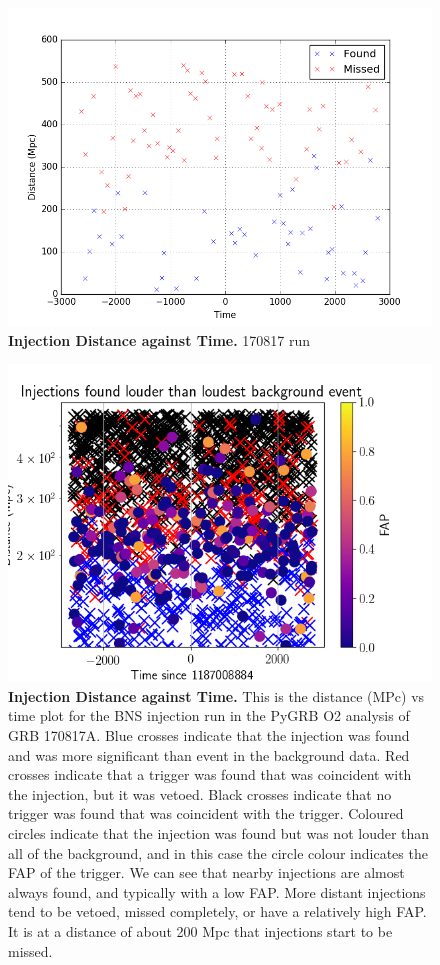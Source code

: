 \documentclass[11pt]{cuthesis}
\begin{document}
\begin{figure} %
\begin{center}
\includegraphics[width=0.8\linewidth]{injections_dist_time.png}
\end{center}
\caption{\textbf{Injection Distance against Time.} 170817 run} 
\label{fig:inj dist time}
\end{figure}

\begin{figure} %
\begin{center}
\includegraphics[width=0.8\linewidth]{found_missed_injections_dist_time.png}
\end{center}
\caption{\textbf{Injection Distance against Time.} This is the distance (MPc) vs time plot for the BNS injection run in the PyGRB O2 analysis of GRB 170817A. Blue crosses indicate that the injection was found and was more significant than event in the background data. Red crosses indicate that a trigger was found that was coincident with the injection, but it was vetoed. Black crosses indicate that no trigger was found that was coincident with the trigger. Coloured circles indicate that the injection was found but was not louder than all of the background, and in this case the circle colour indicates the FAP of the trigger. We can see that nearby injections are almost always found, and typically with a low FAP. More distant injections tend to be vetoed, missed completely, or have a relatively high FAP. It is at a distance of about 200 Mpc that injections start to be missed.} 
\label{fig:old inj dist time}
\end{figure}
\end{document}
